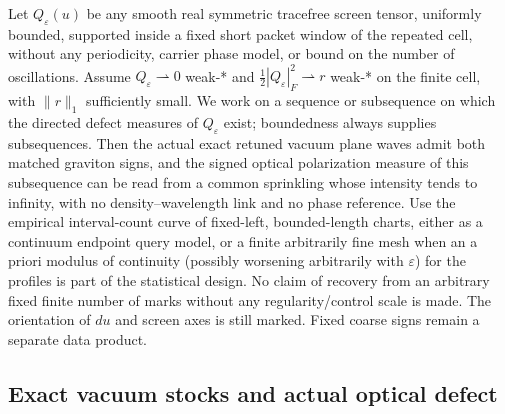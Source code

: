 \documentclass[11pt]{article}
\begin{document}
Let \(Q_\varepsilon(u)\) be any smooth real symmetric tracefree screen tensor, uniformly bounded, supported inside a fixed short packet window of the repeated cell, without any periodicity, carrier phase model, or bound on the number of oscillations. Assume \(Q_\varepsilon\rightharpoonup0\) weak-* and \(\tfrac12|Q_\varepsilon|_F^2\rightharpoonup r\) weak-* on the finite cell, with \(\|r\|_1\) sufficiently small. We work on a sequence or subsequence on which the directed defect measures of \(Q_\varepsilon\) exist; boundedness always supplies subsequences. Then the actual exact retuned vacuum plane waves admit both matched graviton signs, and the signed optical polarization measure of this subsequence can be read from a common sprinkling whose intensity tends to infinity, with no density--wavelength link and no phase reference. Use the empirical interval-count curve of fixed-left, bounded-length charts, either as a continuum endpoint query model, or a finite arbitrarily fine mesh when an a priori modulus of continuity (possibly worsening arbitrarily with \(\varepsilon\)) for the profiles is part of the statistical design. No claim of recovery from an arbitrary fixed finite number of marks without any regularity/control scale is made. The orientation of \(du\) and screen axes is still marked. Fixed coarse signs remain a separate data product.

\subsection{Exact vacuum stocks and actual optical defect}\label{exact-vacuum-stocks-and-actual-optical-defect}
\end{document}
